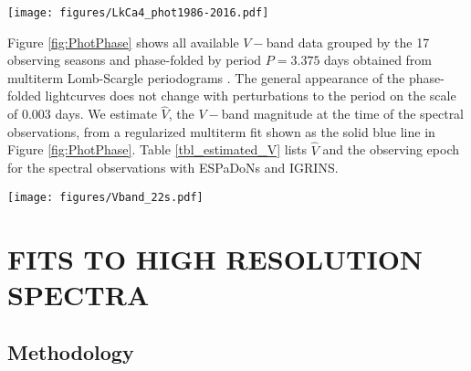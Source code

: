 \documentclass[twocolumn]{emulateapj}%
\newcommand{\name}{LkCa4 }
\begin{document}
\begin{figure*}
	\centering
	\texttt{[image: figures/LkCa4\_phot1986-2016.pdf]}
	\caption{\name $V-$band photometric monitoring from 1992-2016.}
	\label{fig:PhotTime}
\end{figure*}

Figure \ref{fig:PhotPhase} shows all available $V-$band data grouped by the 17 observing seasons and phase-folded by period $P=3.375$ days obtained from multiterm Lomb-Scargle periodograms \citep{ivezic14}.  The general appearance of the phase-folded lightcurves does not change with perturbations to the period on the scale of 0.003 days.  We estimate $\hat V$, the $V-$band magnitude at the time of the spectral observations, from a regularized multiterm fit \citep{vanderplas15a} shown as the solid blue line in Figure \ref{fig:PhotPhase}.  Table \ref{tbl_estimated_V} lists $\hat V$ and the observing epoch for the spectral observations with ESPaDoNs and IGRINS.

\begin{figure*}
	\centering
	\texttt{[image: figures/Vband\_22s.pdf]}
	\caption{Phase-folded lightcurves constructed assuming the same period for all observing seasons.  The blue solid lines show a multi-term periodic fit keeping the first $M_{\rm max}=4$ Fourier components.  The vertical lines show the epochs of observations for available spectroscopy.  The unchanged vertical scale highlights the secular drift of the light curve amplitude and morphology.}
	\label{fig:PhotPhase}
\end{figure*}





\section{FITS TO HIGH RESOLUTION SPECTRA}


\subsection{Methodology}\label{sec:methods} 
\end{document}
